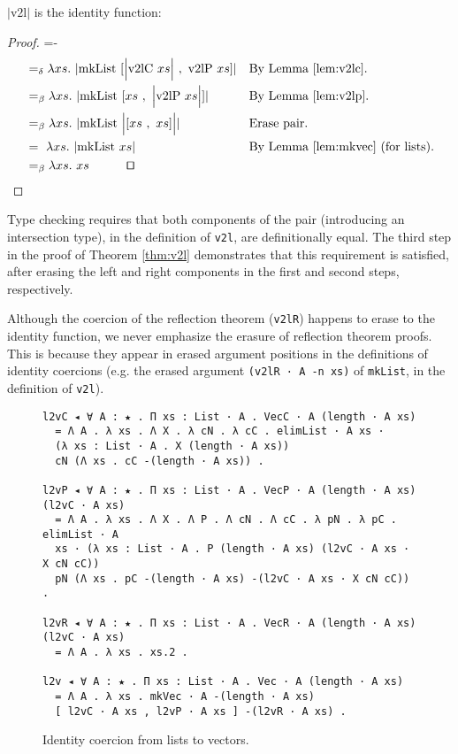 \documentclass[a4paper,envcountsame,envcountsect]{llncs}
\newcommand{\eqed}[0]{\tag*{\qed}}
\newcommand{\labfig}[1]{\label{fig:#1}}
\newcommand{\labrem}[1]{\label{rem:#1}}
\newcommand{\refthm}[1]{Theorem \ref{thm:#1}}
\newcommand{\labthm}[1]{\label{thm:#1}}
\newcommand{\reflem}[1]{Lemma \ref{lem:#1}}
\newcommand{\earg}[1]{\,\,#1}
\newcommand{\erase}[1]{\ensuremath{\lvert #1 \rvert}}
\newcommand{\Erase}[1]{\ensuremath{\Big\lvert #1 \Big\rvert}}
\newcommand{\pair}[2]{\ensuremath{[ #1 ~,~ #2]}}
\newcommand{\fun}[1]{\lambda #1 .~}
\newcommand{\by}[1]{\text{#1}}
\newcommand{\name}[1]{\textrm{#1}}
\begin{document}
\begin{theorem}
\erase{\name{v2l}} is the identity function:
\labthm{v2l}
\end{theorem}

\begin{proof}
{\small
\abovedisplayskip=-\baselineskip
\begin{align*}
  &=_\delta \fun{xs} \erase{
    \name{mkList} \earg
    \pair{
      \Erase{\name{v2lC} \earg xs}
    }{
      \name{v2lP} \earg xs
    }
  }
  && \by{By \reflem{v2lc}.}
  \\
  &=_\beta \fun{xs} \erase{
    \name{mkList} \earg
    \pair{
      xs
    }{
      \Erase{\name{v2lP} \earg xs}
    }
  }
  && \by{By \reflem{v2lp}.}
  \\
  &=_\beta \fun{xs} \erase{
    \name{mkList} \earg
    \Erase{\pair{xs}{xs}}
  }
  && \by{Erase pair.}
  \\
  &=~ \fun{xs} \erase{
    \name{mkList} \earg xs
  }
  && \by{By \reflem{mkvec} (for lists).}
  \\
  &=_\beta \fun{xs}{xs}
  \eqed
\end{align*}}
\end{proof}

Type checking requires that both components of
the pair (introducing an intersection type), in the definition of
\texttt{v2l}, are definitionally equal. The
third step in the proof of \refthm{v2l} demonstrates that this
requirement is satisfied, after erasing the left and right components
in the first and second steps, respectively.

\begin{remark}
Although the coercion of the reflection theorem (\texttt{v2lR})
happens to erase to the identity function, we never emphasize the erasure of
reflection theorem proofs. This is because they appear in erased
argument positions in the definitions of identity coercions (e.g.
the erased argument \texttt{(v2lR · A -n xs)}
of \texttt{mkList}, in the definition of \texttt{v2l}).
\labrem{reflect}
\end{remark}

\begin{figure}[t]
\centering
\begin{verbatim}
l2vC ◂ ∀ A : ★ . Π xs : List · A . VecC · A (length · A xs)
  = Λ A . λ xs . Λ X . λ cN . λ cC . elimList · A xs ·
  (λ xs : List · A . X (length · A xs))
  cN (Λ xs . cC -(length · A xs)) .

l2vP ◂ ∀ A : ★ . Π xs : List · A . VecP · A (length · A xs) (l2vC · A xs)
  = Λ A . λ xs . Λ X . Λ P . Λ cN . Λ cC . λ pN . λ pC . elimList · A 
  xs · (λ xs : List · A . P (length · A xs) (l2vC · A xs · X cN cC))
  pN (Λ xs . pC -(length · A xs) -(l2vC · A xs · X cN cC)) .

l2vR ◂ ∀ A : ★ . Π xs : List · A . VecR · A (length · A xs) (l2vC · A xs)
  = Λ A . λ xs . xs.2 .

l2v ◂ ∀ A : ★ . Π xs : List · A . Vec · A (length · A xs)
  = Λ A . λ xs . mkVec · A -(length · A xs)
  [ l2vC · A xs , l2vP · A xs ] -(l2vR · A xs) .
\end{verbatim}
\caption{Identity coercion from lists to vectors.}
\labfig{l2v}
\end{figure}
\end{document}

